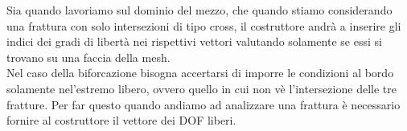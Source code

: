
Sia quando lavoriamo sul dominio del mezzo, che quando stiamo considerando una frattura con solo intersezioni di tipo cross, il costruttore andrà a inserire gli indici dei gradi di libert\`{a} nei rispettivi vettori valutando solamente se essi si trovano su una faccia della mesh.\\
Nel caso della biforcazione bisogna accertarsi di imporre le condizioni al bordo solamente nel'estremo libero, ovvero quello in cui non v\`{e} l'intersezione delle tre fratture.
%
Per far questo quando andiamo ad analizzare una frattura \`{e} necessario fornire al costruttore il vettore dei DOF liberi.


 

				
%		
%


